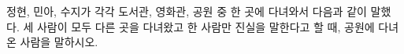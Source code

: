 정현, 민아, 수지가 각각 도서관, 영화관, 공원 중 한 곳에 다녀와서 다음과 같이 말했다.  세 사람이 모두 다른 곳을 다녀왔고 한 사람만 진실을 말한다고 할 때, 공원에 다녀온 사람을 말하시오.
